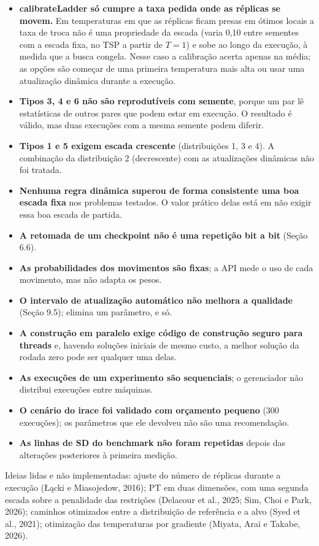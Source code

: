 \documentclass[10pt,a4paper]{article}
\newcommand{\code}[1]{{\ttfamily #1}}
\begin{document}
\begin{itemize}
\item \textbf{\code{calibrateLadder} só cumpre a taxa pedida onde as réplicas se movem.} Em temperaturas em que as réplicas ficam presas em ótimos locais a taxa de troca não é uma propriedade da escada (varia 0,10 entre sementes com a escada fixa, no TSP a partir de $T = 1$) e sobe ao longo da execução, à medida que a busca congela. Nesse caso a calibração acerta apenas na média; as opções são começar de uma primeira temperatura mais alta ou usar uma atualização dinâmica durante a execução.
\item \textbf{Tipos 3, 4 e 6 não são reprodutíveis com semente}, porque um par lê estatísticas de outros pares que podem estar em execução. O resultado é válido, mas duas execuções com a mesma semente podem diferir.
\item \textbf{Tipos 1 e 5 exigem escada crescente} (distribuições 1, 3 e 4). A combinação da distribuição 2 (decrescente) com as atualizações dinâmicas não foi tratada.
\item \textbf{Nenhuma regra dinâmica superou de forma consistente uma boa escada fixa} nos problemas testados. O valor prático delas está em não exigir essa boa escada de partida.
\item \textbf{A retomada de um checkpoint não é uma repetição bit a bit} (Seção 6.6).
\item \textbf{As probabilidades dos movimentos são fixas}; a API mede o uso de cada movimento, mas não adapta os pesos.
\item \textbf{O intervalo de atualização automático não melhora a qualidade} (Seção 9.5); elimina um parâmetro, e só.
\item \textbf{A construção em paralelo exige código de construção seguro para threads} e, havendo soluções iniciais de mesmo custo, a melhor solução da rodada zero pode ser qualquer uma delas.
\item \textbf{As execuções de um experimento são sequenciais}; o gerenciador não distribui execuções entre máquinas.
\item \textbf{O cenário do irace foi validado com orçamento pequeno} (300 execuções); os parâmetros que ele devolveu não são uma recomendação.
\item \textbf{As linhas de SD do benchmark não foram repetidas} depois das alterações posteriores à primeira medição. \end{itemize}

Ideias lidas e não implementadas: ajuste do número de réplicas durante a execução (Łącki e Miasojedow, 2016); PT em duas dimensões, com uma segunda escada sobre a penalidade das restrições (Delacour et al., 2025; Sim, Choi e Park, 2026); caminhos otimizados entre a distribuição de referência e a alvo (Syed et al., 2021); otimização das temperaturas por gradiente (Miyata, Arai e Takabe, 2026).
\end{document}

